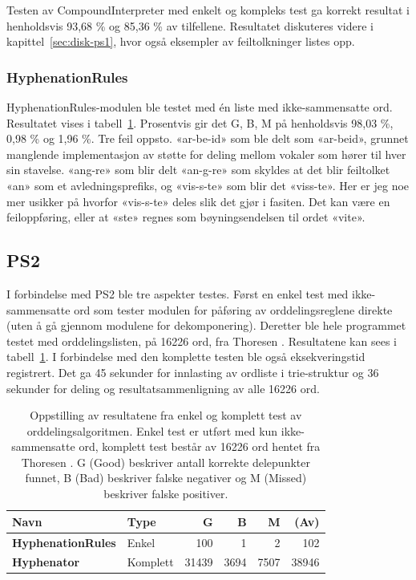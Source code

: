 Testen av CompoundInterpreter med enkelt og kompleks test ga korrekt resultat i  henholdsvis 93,68 \% og 85,36 \% av tilfellene. Resultatet diskuteres videre i kapittel~\ref{sec:disk-ps1}, hvor også eksempler av feiltolkninger listes opp.

\subsubsection{HyphenationRules}

HyphenationRules-modulen ble testet med én liste med ikke-sammensatte ord. Resultatet vises i tabell~\ref{tab:hyphenation-results}. Prosentvis gir det G, B, M på henholdsvis 98,03 \%, 0,98 \% og 1,96 \%. Tre feil oppsto. «ar-be-id» som ble delt som «ar-beid», grunnet manglende implementasjon av støtte for deling mellom vokaler som hører til hver sin stavelse. «ang-re» som blir delt «an-g-re» som skyldes at det blir feiltolket «an» som et avledningsprefiks, og «vis-s-te» som blir det «viss-te». Her er jeg noe mer usikker på hvorfor «vis-s-te» deles slik det gjør i fasiten. Det kan være en feiloppføring, eller at «ste» regnes som bøyningsendelsen til ordet «vite».

\subsection{PS2}

I forbindelse med PS2 ble tre aspekter testes. Først en enkel test med ikke-sammensatte ord som tester modulen for påføring av orddelingsreglene direkte (uten å gå gjennom modulene for dekomponering). Deretter ble hele programmet testet med orddelingslisten, på 16226 ord, fra Thoresen \cite{thoresen1993virtuelle}. Resultatene kan sees i tabell~\ref{tab:hyphenation-results}. I forbindelse med den komplette testen ble også eksekveringstid registrert. Det ga 45 sekunder for innlasting av ordliste i trie-struktur og 36 sekunder for deling og resultatsammenligning av alle 16226 ord. 

\begin{table}[h]
	\centering 
	\begin{tabular}{llrrrr} \hline 
		\textbf{Navn} & \textbf{Type} & \textbf{G} & \textbf{B} & \textbf{M} & \textbf{(Av)} \\
		\hline \textbf{HyphenationRules} & Enkel & 100 & 1 & 2 & 102 \\
		\hline \textbf{Hyphenator} & Komplett & 31439 & 3694 & 7507 & 38946 \\
		\hline 
	\end{tabular}
	\caption[Resultater fra test av Hyphenator-programmet]{Oppstilling av resultatene fra enkel og komplett test av orddelingsalgoritmen. Enkel test er utført med kun ikke-sammensatte ord, komplett test består av 16226 ord hentet fra Thoresen \cite{thoresen1993virtuelle}. G (Good) beskriver antall korrekte delepunkter funnet, B (Bad) beskriver falske negativer og M (Missed) beskriver falske positiver.} \label{tab:hyphenation-results} 
\end{table}

